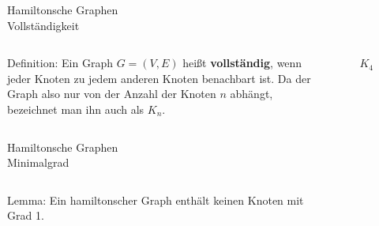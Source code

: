 \documentclass{beamer}
\begin{document}
%
%
%
\begin{frame}{Hamiltonsche Graphen\\\normalsize{Vollständigkeit}}

\begin{columns}

\begin{block}{Definition:}
Ein Graph $G=(V,E)$ heißt \textbf{vollständig}, wenn jeder Knoten zu jedem anderen Knoten benachbart ist. Da der Graph also nur von der Anzahl der Knoten $n$ abhängt, bezeichnet man ihn auch als $K_n$.
\end{block}

\begin{figure}
\centering
{}
\caption{$K_4$}
\end{figure}

\end{columns}

\end{frame}


%
%
%
\begin{frame}{Hamiltonsche Graphen\\\normalsize{Minimalgrad}}

\begin{columns}


\begin{block}{Lemma:}
	Ein hamiltonscher Graph enthält keinen Knoten mit Grad 1.
\end{block}

\begin{figure}
\centering
{}
\end{figure}

\end{columns}

\end{frame}
\end{document}
